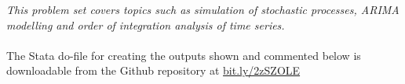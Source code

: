 \textit{This problem set covers topics such as simulation of stochastic processes, ARIMA
modelling and order of integration analysis of time series.}
\\ \\
The Stata do-file for creating the outputs shown and commented below is downloadable from the Github repository at \href{https://bit.ly/2zSZOLE}{bit.ly/2zSZOLE}
